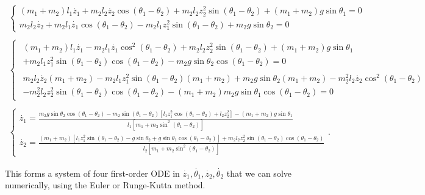\documentclass[11pt, leqno]{article}
\begin{document}
\begin{gather*}
	\begin{cases}
		(m_1+m_2)l_1 \dot{z_1} + m_2l_2 \dot{z_2} \cos(\theta_1-\theta_2) + m_2l_2 z_2^2\sin(\theta_1-\theta_2) + (m_1+m_2)g \sin\theta_1 = 0\\
		m_2l_2 \dot{z_2} + m_2l_1 \dot{z_1}\cos(\theta_1-\theta_2) - m_2l_1z_1^2\sin(\theta_1-\theta_2) + m_2g\sin \theta_2 = 0
	\end{cases}\\ \\
	\begin{cases}
		\begin{split}
			(m_1+m_2)l_1 \dot{z_1} - m_2l_1 \dot{z_1}\cos^2(\theta_1-\theta_2) + m_2l_2 z_2^2\sin(\theta_1-\theta_2) + (m_1+m_2)g\sin\theta_1\\ + m_2l_1z_1^2 \sin(\theta_1-\theta_2)\cos(\theta_1-\theta_2) - m_2g\sin\theta_2\cos(\theta_1-\theta_2) = 0
		\end{split}\\
		\begin{split}
			m_2l_2 \dot{z_2}(m_1+m_2)-m_2l_1z_1^2\sin(\theta_1-\theta_2) (m_1+m_2) +m_2g\sin\theta_2(m_1+m_2) - m_2^2l_2 \dot{z_2} \cos^2(\theta_1-\theta_2) \\ - m_2^2l_2z_2^2\sin(\theta_1-\theta_2) \cos(\theta_1-\theta_2) - (m_1+m_2)m_2g\sin\theta_1\cos(\theta_1-\theta_2) = 0
		\end{split}
	\end{cases}\\ \\
	\begin{cases}
		\dot{z_1} = \frac{m_2g\sin\theta_2\cos(\theta_1-\theta_2) - m_2\sin(\theta_1-\theta_2)[l_1z_1^2\cos(\theta_1-\theta_2) + l_2z_2^2] - (m_1 + m_2)g\sin\theta_1}{l_1[m_1 + m_2\sin^2(\theta_1-\theta_2)]} \\
		\dot{z_2} = \frac{(m_1+m_2)[l_1z_1^2\sin(\theta_1-\theta_2) - g\sin\theta_2  + g\sin\theta_1 \cos(\theta_1-\theta_2)] + m_2l_2z_2^2\sin(\theta_1-\theta_2)\cos(\theta_1-\theta_2)}{l_2[m_1 + m_2\sin^2(\theta_1-\theta_2)]}
	\end{cases}
.\end{gather*}

This forms a system of four first-order ODE in $\dot{z_1}, \dot{\theta_1}, \dot{z_2}, \dot{\theta_2}$ that we can solve numerically, using the Euler or Runge-Kutta method.

\pagebreak
\tableofcontents{}
\end{document}
